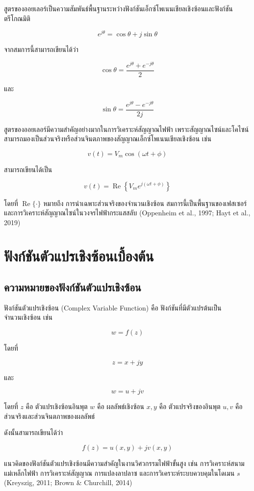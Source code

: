 สูตรของออยเลอร์เป็นความสัมพันธ์พื้นฐานระหว่างฟังก์ชันเอ็กซ์โพเนนเชียลเชิงซ้อนและฟังก์ชันตรีโกณมิติ

\[
e^{j\theta}=\cos\theta+j\sin\theta
\]

จากสมการนี้สามารถเขียนได้ว่า

\[
\cos\theta=\frac{e^{j\theta}+e^{-j\theta}}{2}
\]

และ

\[
\sin\theta=\frac{e^{j\theta}-e^{-j\theta}}{2j}
\]

สูตรของออยเลอร์มีความสำคัญอย่างมากในการวิเคราะห์สัญญาณไฟฟ้า เพราะสัญญาณไซน์และโคไซน์สามารถมองเป็นส่วนจริงหรือส่วนจินตภาพของสัญญาณเอ็กซ์โพเนนเชียลเชิงซ้อน เช่น

\[
v(t)=V_m\cos(\omega t+\phi)
\]

สามารถเขียนได้เป็น

\[
v(t)=\operatorname{Re}\left\{V_me^{j(\omega t+\phi)}\right\}
\]

โดยที่ $\operatorname{Re}\{\cdot\}$ หมายถึง การนำเฉพาะส่วนจริงของจำนวนเชิงซ้อน สมการนี้เป็นพื้นฐานของเฟสเซอร์และการวิเคราะห์สัญญาณไซน์ในวงจรไฟฟ้ากระแสสลับ (Oppenheim et al., 1997; Hayt et al., 2019)

\section{ฟังก์ชันตัวแปรเชิงซ้อนเบื้องต้น}

\subsection{ความหมายของฟังก์ชันตัวแปรเชิงซ้อน}

ฟังก์ชันตัวแปรเชิงซ้อน (Complex Variable Function) คือ ฟังก์ชันที่มีตัวแปรต้นเป็นจำนวนเชิงซ้อน เช่น

\[
w=f(z)
\]

โดยที่

\[
z=x+jy
\]

และ

\[
w=u+jv
\]

โดยที่  
$z$ คือ ตัวแปรเชิงซ้อนอินพุต  
$w$ คือ ผลลัพธ์เชิงซ้อน  
$x,y$ คือ ตัวแปรจริงของอินพุต  
$u,v$ คือ ส่วนจริงและส่วนจินตภาพของผลลัพธ์

ดังนั้นสามารถเขียนได้ว่า

\[
f(z)=u(x,y)+jv(x,y)
\]

แนวคิดของฟังก์ชันตัวแปรเชิงซ้อนมีความสำคัญในงานวิศวกรรมไฟฟ้าขั้นสูง เช่น การวิเคราะห์สนามแม่เหล็กไฟฟ้า การวิเคราะห์สัญญาณ การแปลงลาปลาซ และการวิเคราะห์ระบบควบคุมในโดเมน $s$ (Kreyszig, 2011; Brown \& Churchill, 2014)

